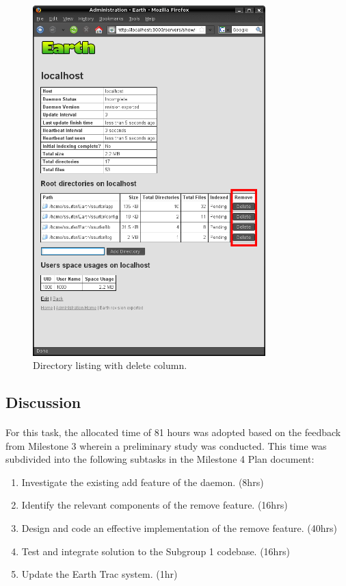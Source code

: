 \documentclass[10pt,a4,oneside]{article}
\begin{document}
\begin{figure}[h!]
\begin{center}
\includegraphics[width=90mm]{figs/screendel}
\end{center}
\caption{Directory listing with delete column.}
\label{fig:screendel}
\end{figure}


\newpage

\subsection*{Discussion}

\paragraph{}
For this task, the allocated time of 81 hours was adopted based 
on the feedback from Milestone 3 wherein a preliminary study was 
conducted. This time was subdivided into the following subtasks in 
the Milestone 4 Plan document:

\begin{enumerate}
\item Investigate the existing add feature of the daemon. (8hrs)
\item Identify the relevant components of the remove feature. (16hrs)
\item Design and code an effective implementation of the remove feature. (40hrs)
\item Test and integrate solution to the Subgroup 1 codebase. (16hrs)
\item Update the Earth Trac system. (1hr)
\end{enumerate}
\end{document}
